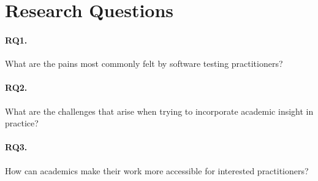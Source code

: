 \section{Research Questions}\label{sec:ind_rqs}


\paragraph{RQ1. } What are the pains most commonly felt by software testing practitioners?
\paragraph{RQ2. } What are the challenges that arise when trying to incorporate academic insight in practice?
\paragraph{RQ3. } How can academics make their work more accessible for interested practitioners?
